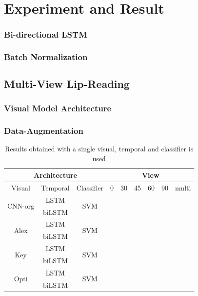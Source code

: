 \section{Experiment and Result}


\subsubsection{Bi-directional LSTM}
\subsubsection{Batch Normalization}

\subsection{Multi-View Lip-Reading}
\subsubsection{Visual Model Architecture}
\subsubsection{Data-Augmentation}


\begin{table}[h]
\centering
    \begin{tabular}{ccc|cccccc}
        \multicolumn{3}{c|}{Architecture} &%
        \multicolumn{6}{c}{View}\\ \hline
        Visual  & Temporal & Classifier &%
        0& 30 & 45 & 60 & 90 & multi\\\hline
        \multirow{2}{*}{CNN-org}%
        & LSTM & \multirow{2}{*}{SVM} &%
        & & & & &\\
        & biLSTM & &%
        & & & & &\\
        \multirow{2}{*}{Alex}%
        & LSTM & \multirow{2}{*}{SVM} &%
        & & & & &\\
        & biLSTM & &%
        & & & & &\\
        \multirow{2}{*}{Key}%
        & LSTM & \multirow{2}{*}{SVM} &%
        & & & & &\\
        & biLSTM & &%
        & & & & &\\
        \multirow{2}{*}{Opti}%
        & LSTM & \multirow{2}{*}{SVM} &%
        & & & & &\\
        & biLSTM & &%
        & & & & &\\
    \end{tabular}
    \caption{Results obtained with a single visual, temporal and classifier is used}
    \label{tab:resDiffArch}
\end{table}

